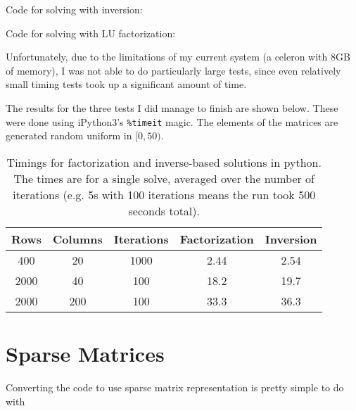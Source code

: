 \documentclass{article}
\begin{document}
Code for solving with inversion:



Code for solving with LU factorization:



Unfortunately, due to the limitations of my current system (a celeron with 8GB
of memory), I was not able to do particularly large tests, since even relatively
small timing tests took up a significant amount of time.

The results for the three tests I did manage to finish are shown below. These
were done using iPython3's \texttt{\%timeit} magic. The elements of the matrices
are generated random uniform in $[0,50)$.

\begin{table}[h]
  \centering
  \begin{tabular}{|c|c|c|c|c|}
    \hline
    Rows & Columns & Iterations & Factorization & Inversion \\ \hline \hline
    400 & 20 & 1000 & 2.44 & 2.54\\ \hline
    2000 & 40 & 100 & 18.2 & 19.7\\ \hline
    2000 & 200 & 100 & 33.3 & 36.3\\ \hline
  \end{tabular}
  \caption{Timings for factorization and inverse-based solutions in python. The
    times are for a single solve, averaged over the number of iterations (e.g.
    5s with 100 iterations means the run took 500 seconds total).}
  \label{tab: solvecomparetimings}
\end{table}

\section{Sparse Matrices}

Converting the code to use sparse matrix representation is pretty simple to do
with
\end{document}

